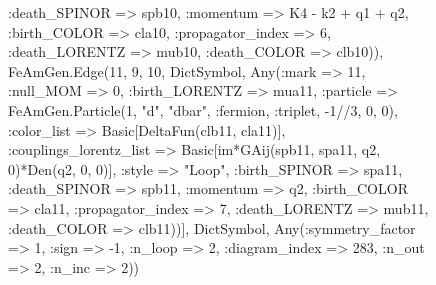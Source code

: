 \documentclass{revtex4}
\begin{document}
\begin{figure}[!htb]
\begin{center}
{:death_SPINOR => spb10, :momentum => K4 - k2 + q1 + q2, :birth_COLOR => cla10, :propagator_index => 6, :death_LORENTZ => mub10, :death_COLOR => clb10)), FeAmGen.Edge(11, 9, 10, Dict{Symbol, Any}(:mark => 11, :null_MOM => 0, :birth_LORENTZ => mua11, :particle => FeAmGen.Particle(1, "d", "dbar", :fermion, :triplet, -1//3, 0, 0), :color_list => Basic[DeltaFun(clb11, cla11)], :couplings_lorentz_list => Basic[im*GAij(spb11, spa11, q2, 0)*Den(q2, 0, 0)], :style => "Loop", :birth_SPINOR => spa11, :death_SPINOR => spb11, :momentum => q2, :birth_COLOR => cla11, :propagator_index => 7, :death_LORENTZ => mub11, :death_COLOR => clb11))], Dict{Symbol, Any}(:symmetry_factor => 1, :sign => -1, :n_loop => 2, :diagram_index => 283, :n_out => 2, :n_inc => 2)) 
}
\end{center}
\end{figure}
\end{document}
